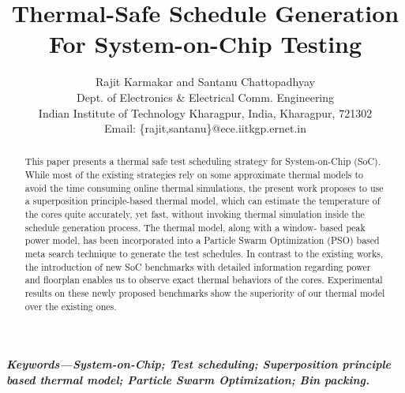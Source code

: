 \documentclass[conference]{IEEEtran}
\begin{document}
\title{Thermal-Safe Schedule Generation For
System-on-Chip Testing}

\author{Rajit Karmakar and Santanu Chattopadhyay\\
	Dept. of Electronics \& Electrical Comm. Engineering\\
		Indian Institute of Technology Kharagpur, India, Kharagpur, 721302\\
	Email: \{rajit,santanu\}@ece.iitkgp.ernet.in 
}



	\maketitle
	\begin{abstract}
		This paper presents a thermal safe test scheduling
strategy for System-on-Chip (SoC). While most of the existing
strategies rely on some approximate thermal models to avoid
the time consuming online thermal simulations, the present work
proposes to use a superposition principle-based thermal model,
which can estimate the temperature of the cores quite accurately,
yet fast, without invoking thermal simulation inside the schedule
generation process. The thermal model, along with a window-
based peak power model, has been incorporated into a Particle
Swarm Optimization (PSO) based meta search technique to
generate the test schedules. In contrast to the existing works, the
introduction of new SoC benchmarks with detailed information
regarding power and floorplan enables us to observe exact
thermal behaviors of the cores. Experimental results on these
newly proposed benchmarks show the superiority of our thermal
model over the existing ones.
	\end{abstract}
	
\textbf{\textit{Keywords---System-on-Chip; Test scheduling; Superposition
principle based thermal model; Particle Swarm Optimization; Bin
packing.}}
\end{document}

